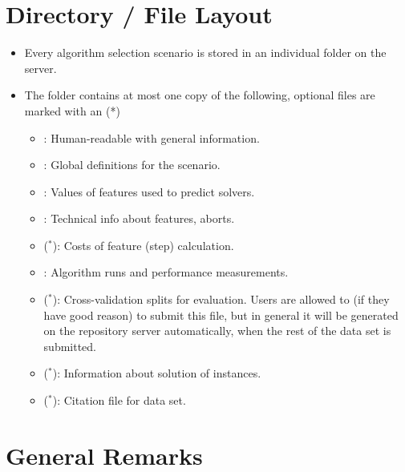 

\section{Directory / File Layout} 
\begin{itemize}
	\item Every algorithm selection scenario is stored in an individual folder on the server.
	\item The folder contains at most one copy of the following, optional files are marked with an (*)
  	\begin{itemize}
  		\item {}: Human-readable with general information. 
  		\item {}: Global definitions for the scenario. 
  		\item {}: Values of features used to predict solvers. 
  		\item {}: Technical info about features, \eg{} aborts. 
  		\item {} ($^*$): Costs of feature (step) calculation.
  		\item {}: Algorithm runs and performance measurements.
  		\item {} ($^*$): Cross-validation splits for evaluation. Users are allowed
                  to (if they have good reason) to submit this file, but in general it will be generated
                  on the repository server automatically, when the rest of the data set is submitted.
		\item {} ($^*$): Information about solution of instances. 
		\item {} ($^*$): Citation file for data set. 
  	\end{itemize}
\end{itemize}


\section{General Remarks} 

